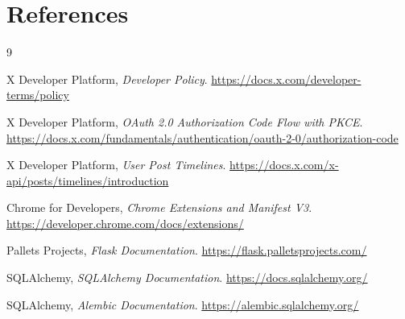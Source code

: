 \documentclass[11pt,a4paper]{report}
\begin{document}
\chapter{References}
\begin{thebibliography}{9}

X Developer Platform,
\emph{Developer Policy}.
\url{https://docs.x.com/developer-terms/policy}

X Developer Platform,
\emph{OAuth 2.0 Authorization Code Flow with PKCE}.
\url{https://docs.x.com/fundamentals/authentication/oauth-2-0/authorization-code}

X Developer Platform,
\emph{User Post Timelines}.
\url{https://docs.x.com/x-api/posts/timelines/introduction}

Chrome for Developers,
\emph{Chrome Extensions and Manifest V3}.
\url{https://developer.chrome.com/docs/extensions/}

Pallets Projects,
\emph{Flask Documentation}.
\url{https://flask.palletsprojects.com/}

SQLAlchemy,
\emph{SQLAlchemy Documentation}.
\url{https://docs.sqlalchemy.org/}

SQLAlchemy,
\emph{Alembic Documentation}.
\url{https://alembic.sqlalchemy.org/}

\end{thebibliography}
\end{document}
